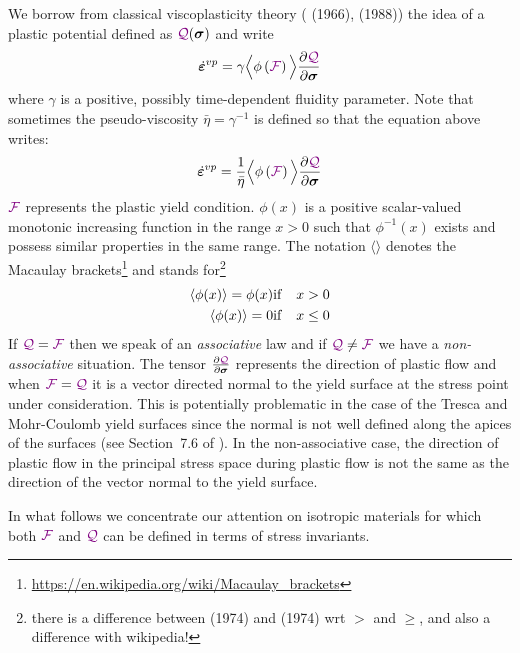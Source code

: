 We borrow from classical viscoplasticity theory (\textcite{perz66} (1966), \textcite{perz88} (1988)) the idea of 
a plastic potential defined as ${\color{violet}\cal Q}({\bm \sigma})$ and write
\begin{equation}
{\dot{\bm \varepsilon}}^{vp} 
= \gamma \Big\langle
\phi\left( {{\color{violet}\cal F}} \right) 
\Big\rangle
\frac{\partial {\color{violet}\cal Q}}{\partial \bm\sigma}
\end{equation}
where $\gamma$ is a positive, possibly time-dependent fluidity parameter. 
Note that sometimes the pseudo-viscosity $\bar{\eta}=\gamma^{-1}$ is defined \cite{zigo74}
so that the equation above writes:
\begin{equation}
{\dot{\bm \varepsilon}}^{vp} 
= \frac{1}{\bar{\eta}} \Big\langle
\phi\left( {{\color{violet}\cal F}} \right) 
\Big\rangle
\frac{\partial {\color{violet}\cal Q}}{\partial \bm\sigma}
\end{equation}
${{\color{violet}\cal F}}$ represents the plastic yield condition.
$\phi(x)$ is a positive scalar-valued monotonic increasing function in the range 
$x>0$ such that $\phi^{-1}(x)$ exists and possess similar properties in the same range. 
The notation $\langle \rangle$ denotes the Macaulay 
brackets\footnote{\url{https://en.wikipedia.org/wiki/Macaulay_brackets}} and stands 
for\footnote{there is a difference between 
\textcite{zico74}(1974) and \textcite{zico74b}(1974) wrt $>$ and $\ge$, and also 
a difference with wikipedia!} 
\begin{eqnarray}
\langle \phi(x) \rangle = \phi(x) & {\rm if} & x>0 \nonumber\\
\langle \phi(x) \rangle = 0 & {\rm if} & x\le 0 \nonumber
\end{eqnarray}
If ${{\color{violet}\cal Q}}={{\color{violet}\cal F}}$ then we speak of an {\it associative} law and if ${{\color{violet}\cal Q}} \neq {{\color{violet}\cal F}}$ 
we have a {\it non-associative} situation. 
The tensor $\frac{\partial {\color{violet}\cal Q}}{\partial \bm\sigma}$ represents the direction
of plastic flow and when ${{\color{violet}\cal F}}={{\color{violet}\cal Q}}$ it is a vector directed normal to the yield surface
at the stress point under consideration. This is potentially problematic in the 
case of the Tresca and Mohr-Coulomb yield surfaces since the normal is not well defined
along the apices of the surfaces (see Section~7.6 of \textcite{owhi}).
In the non-associative case, the direction of plastic flow in the 
principal  stress space during plastic flow is not the same
as the direction of the vector normal to the yield surface.

In what follows we concentrate our attention on isotropic materials for which 
both ${{\color{violet}\cal F}}$ and ${{\color{violet}\cal Q}}$ can be defined in terms of stress invariants.

